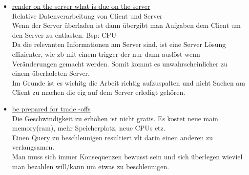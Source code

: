 \documentclass[12pt]{article}\pagestyle{myheadings}
\theoremstyle{plain}
\begin{document}
\begin{enumerate}
\begin{itemize}
\item \underline{render on the server what is due on the server}\\
Relative Datenverarbeitung von Client und Server\\
Wenn der Server überladen ist dann übergibt man Aufgaben dem Client um den Server zu entlasten. Bsp: CPU\\
Da die relevanten Informationen am Server sind, ist eine Server Lösung effizienter, wie zb mit einem trigger der nur dann auslöst wenn Veränderungen gemacht werden. Somit kommt es unwahrscheinlicher zu einem überladeten Server.\\
Im Grunde ist es wichitg die Arbeit richtig aufzuspalten und nicht Sachen am Client zu machen die eig auf dem Server erledigt gehören.\\
\item \underline{be prepared for trade -offs} \\
Die Geschwindigkeit zu erhöhen ist nicht gratis.
Es kostet neue main memory(ram), mehr Speicherplatz, neue CPUs etz.\\
Einen Query zu beschleunigen resultiert vlt darin einen anderen zu verlangsamen.\\
Man muss sich immer Konsequenzen bewusst sein und sich überlegen wieviel man bezahlen will/kann um etwas zu beschleunigen.
\end{itemize}


\end{enumerate}
\end{document}
